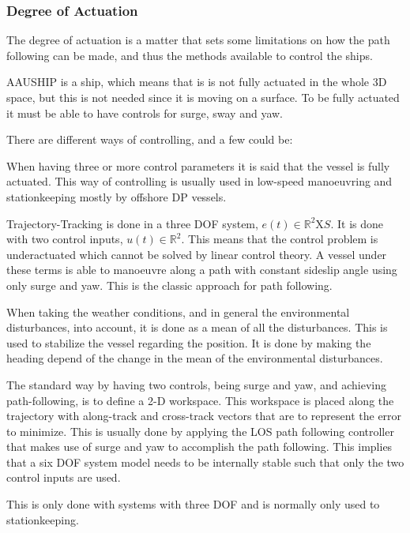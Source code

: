 \subsubsection{Degree of Actuation}
The degree of actuation is a matter that sets some limitations on how
the path following can be made, and thus the methods available to
control the ships.

AAUSHIP is a ship, which means that is is not fully actuated in the
whole 3D space, but this is not needed since it is moving on a
surface. To be fully actuated it must be able to have controls for
surge, sway and yaw.

There are different ways of controlling, and a few could be:
\begin{description}[style=nextline]
	\item [Three or more controls]
	When having three or more control parameters it is said that the vessel is fully actuated. This way of controlling is usually used in low-speed manoeuvring and stationkeeping mostly by offshore \ac{DP} vessels.
	\item [Two controls and Trajectory-Tracking control]
	Trajectory-Tracking is done in a three \ac{DOF} system, $e(t)\in\mathds{R}^2\text{X}S$. It is done with two control inputs, $u(t)\in\mathds{R}^2$. This means that the control problem is underactuated which cannot be solved by linear control theory. A vessel under these terms is able to manoeuvre along a path with constant sideslip angle using only surge and yaw. This is the classic approach for path following.
	\item [Two controls and Weather-Optimal heading]
	When taking the weather conditions, and in general the environmental disturbances, into account, it is done as a mean of all the disturbances. This is used to stabilize the vessel regarding the position. It is done by making the heading depend of the change in the mean of the environmental disturbances.
	\item [Two controls and Path-Following control]
	The standard way by having two controls, being surge and yaw, and achieving path-following, is to define a 2-D workspace. This workspace is placed along the trajectory with along-track and cross-track vectors that are to represent the error to minimize. This is usually done by applying the \ac{LOS} path following controller that makes use of surge and yaw to accomplish the path following. This implies that a six \ac{DOF} system model needs to be internally stable such that only the two control inputs are used.
	\item [One control]
	This is only done with systems with three \ac{DOF} and is normally only used to stationkeeping.
\end{description}
\citep{fossen}

